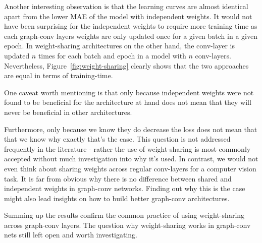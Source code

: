 Another interesting observation is that the learning curves are almost identical apart from the lower MAE of the model with independent weights. It would not have been surprising for the independent weights to require more training time as each graph-conv layers weights are only updated once for a given batch in a given epoch. In weight-sharing architectures on the other hand, the conv-layer is updated $n$ times for each batch and epoch in a model with $n$ conv-layers. Nevertheless, Figure~\ref{fig:weight-sharing} clearly shows that the two approaches are equal in terms of training-time.


One caveat worth mentioning is that only because independent weights were not found to be beneficial for the architecture at hand does not mean that they will never be beneficial in other architectures.

Furthermore, only because we know they do decrease the loss does not mean that that we know why exactly that's the case. This question is not addressed frequently in the literature - rather the use of weight-sharing is most commonly accepted without much investigation into why it's used. In contrast, we would not even think about sharing weights across regular conv-layers for a computer vision task. It is far from obvious why there is no difference between shared and independent weights in graph-conv networks. Finding out why this is the case might also lead insights on how to build better graph-conv architectures.  

Summing up the results confirm the common practice of using weight-sharing across graph-conv layers. The question why weight-sharing works in graph-conv nets still left open and worth investigating.



